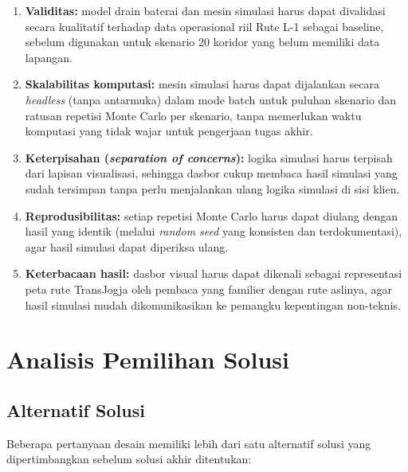 \begin{enumerate}
	\item \textbf{Validitas:} model drain baterai dan mesin simulasi harus
	dapat divalidasi secara kualitatif terhadap data operasional riil
	Rute L-1 sebagai baseline, sebelum digunakan untuk skenario 20 koridor
	yang belum memiliki data lapangan.
	\item \textbf{Skalabilitas komputasi:} mesin simulasi harus dapat
	dijalankan secara \textit{headless} (tanpa antarmuka) dalam mode batch
	untuk puluhan skenario dan ratusan repetisi Monte Carlo per skenario,
	tanpa memerlukan waktu komputasi yang tidak wajar untuk pengerjaan tugas
	akhir.
	\item \textbf{Keterpisahan (\textit{separation of concerns}):} logika
	simulasi harus terpisah dari lapisan visualisasi, sehingga dasbor cukup
	membaca hasil simulasi yang sudah tersimpan tanpa perlu menjalankan ulang
	logika simulasi di sisi klien.
	\item \textbf{Reprodusibilitas:} setiap repetisi Monte Carlo harus dapat
	diulang dengan hasil yang identik (melalui \textit{random seed} yang
	konsisten dan terdokumentasi), agar hasil simulasi dapat diperiksa ulang.
	\item \textbf{Keterbacaan hasil:} dasbor visual harus dapat dikenali sebagai
	representasi peta rute TransJogja oleh pembaca yang familier dengan rute
	aslinya, agar hasil simulasi mudah dikomunikasikan ke pemangku
	kepentingan non-teknis.
\end{enumerate}

\section{Analisis Pemilihan Solusi}

\subsection{Alternatif Solusi}



Beberapa pertanyaan desain memiliki lebih dari satu alternatif solusi yang
dipertimbangkan sebelum solusi akhir ditentukan:

